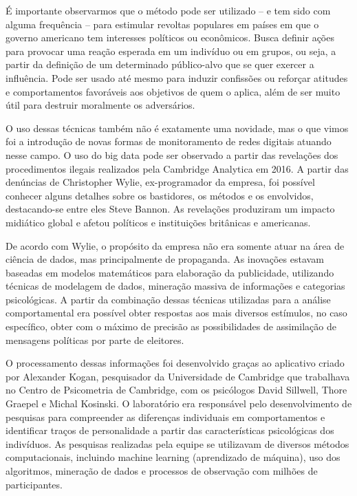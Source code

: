 É importante observarmos que o método pode ser utilizado -- e tem sido
com alguma frequência -- para estimular revoltas populares em países em
que o governo americano tem interesses políticos ou econômicos. Busca
definir ações para provocar uma reação esperada em um indivíduo ou em
grupos, ou seja, a partir da definição de um determinado público-alvo
que se quer exercer a influência. Pode ser usado até mesmo para induzir
confissões ou reforçar atitudes e comportamentos favoráveis aos
objetivos de quem o aplica, além de ser muito útil para destruir
moralmente os adversários.

O uso dessas técnicas também não é exatamente uma novidade, mas o que
vimos foi a introdução de novas formas de monitoramento de redes
digitais atuando nesse campo. O uso do big data pode ser observado a
partir das revelações dos procedimentos ilegais realizados pela
Cambridge Analytica em 2016. A partir das denúncias de Christopher
Wylie, ex-programador da empresa, foi possível conhecer alguns detalhes
sobre os bastidores, os métodos e os envolvidos, destacando-se entre
eles Steve Bannon. As revelações produziram um impacto midiático global
e afetou políticos e instituições britânicas e americanas.

De acordo com Wylie, o propósito da empresa não era somente atuar na
área de ciência de dados, mas principalmente de propaganda. As inovações
estavam baseadas em modelos matemáticos para elaboração da publicidade,
utilizando técnicas de modelagem de dados, mineração massiva de
informações e categorias psicológicas. A partir da combinação dessas
técnicas utilizadas para a análise comportamental era possível obter
respostas aos mais diversos estímulos, no caso específico, obter com o
máximo de precisão as possibilidades de assimilação de mensagens
políticas por parte de eleitores.

O processamento dessas informações foi desenvolvido graças ao aplicativo
criado por Alexander Kogan, pesquisador da Universidade de Cambridge que
trabalhava no Centro de Psicometria de Cambridge, com os psicólogos
David Sillwell, Thore Graepel e Michal Kosinski. O laboratório era
responsável pelo desenvolvimento de pesquisas para compreender as
diferenças individuais em comportamentos e identificar traços de
personalidade a partir das características psicológicas dos indivíduos.
As pesquisas realizadas pela equipe se utilizavam de diversos métodos
computacionais, incluindo machine learning (aprendizado de máquina), uso
dos algoritmos, mineração de dados e processos de observação com milhões
de participantes.

